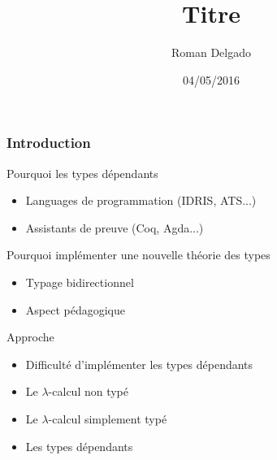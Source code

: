 \documentclass{beamer}
\title{Titre}
\author{Roman Delgado}
\institute[\textsc{Upmc}]{Université Pierre et Marie Curie}
\date{04/05/2016}
\begin{document}
\begin{frame}

\titlepage

\end{frame}


\begin{frame}
  \frametitle{Introduction}

  \begin{block}{Pourquoi les types dépendants}
    \begin{itemize}
    \item Languages de programmation (IDRIS, ATS...)
    \item Assistants de preuve (Coq, Agda...)
    \end{itemize}
  \end{block}

  \begin{block}{Pourquoi implémenter une nouvelle théorie des types}
    \begin{itemize}
    \item Typage bidirectionnel
    \item Aspect pédagogique
    \end{itemize}
  \end{block}  
  \begin{block}{Approche}
    \begin{itemize}
    \item Difficulté d'implémenter les types dépendants 

    \item Le $\lambda$-calcul non typé 
    \item Le $\lambda$-calcul simplement typé 
    \item Les types dépendants
    \end{itemize}
  \end{block}

\end{frame}
\newenvironment{bnf}
               {\[\begin{array}{lcl@{\qquad}r}}
               {\end{array}\]}
\end{document}
